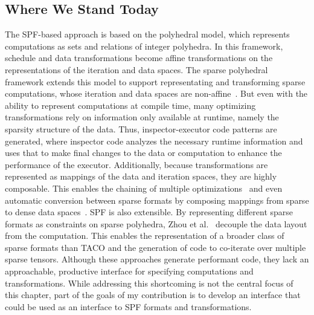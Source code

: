 \cite{strout2003compile}













\subsection{Where We Stand Today}





The SPF-based approach is based on the polyhedral model, which represents computations as sets and relations of integer polyhedra. 
In this framework, schedule and data transformations become affine transformations on the representations of the iteration and data spaces.
The sparse polyhedral framework extends this model to support representating and transforming sparse computations, whose iteration and data spaces are non-affine~\cite{strout2016approach}. 
But even with the ability to represent computations at compile time, many optimizing transformations rely on information only available at runtime, namely the sparsity structure of the data.
Thus, inspector-executor code patterns are generated, where inspector code analyzes the necessary runtime information and uses that to make final changes to the data or computation to enhance the performance of the executor.
Additionally, because transformations are represented as mappings of the data and iteration spaces, they are highly composable. This enables the chaining of multiple optimizations~\cite{ahmad2017optimizing} and even automatic conversion between sparse formats by composing mappings from sparse to dense data spaces~\cite{popoola2023code}. 
SPF is also extensible. By representing different sparse formats as constraints on sparse polyhedra, Zhou et al.~\cite{zhao2022polyhedral} decouple the data layout from the computation. 
This enables the representation of a broader class of sparse formats than TACO and the generation of code to co-iterate over multiple sparse tensors.
Although these approaches generate performant code, they lack an approachable, productive interface for specifying computations and transformations. 
While addressing this shortcoming is not the central focus of this chapter, part of the goals of my contribution is to develop an interface that could be used as an interface to SPF formats and transformations.

